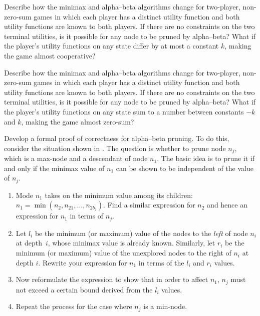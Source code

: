 \begin{uexercise}
Describe how the minimax and alpha--beta algorithms change for two-player,
non-zero-sum games in which each player 
has a distinct utility function and both utility functions are known to both players.  If there are no constraints on
the two terminal utilities, is it possible for any node to be pruned
by alpha--beta? What if the player's utility functions on
any state differ by at most a constant \(k\), making the game almost
cooperative?
\end{uexercise} 

\begin{iexercise}
Describe how the minimax and alpha--beta algorithms change for two-player,
non-zero-sum games in which each player 
has a distinct utility function and both utility functions are known to both players.  If there are no constraints on
the two terminal utilities, is it possible for any node to be pruned
by alpha--beta? What if the player's utility functions on
any state sum to a number between constants \(-k\) and \(k\), making the game almost
zero-sum?
\end{iexercise} 

\begin{exercise}
Develop a formal proof of correctness for alpha--beta
pruning. To do this, consider the situation shown in
. The question is whether to
prune node \(n_j\), which is a max-node and a descendant of node \(n_1\).
The basic idea is to prune it if and only if the minimax value of \(n_1\)
can be shown to be independent of the value of \(n_j\). 
\begin{enumerate} 
\item Mode \(n_1\) takes on the minimum value among its children: \(n_1 = \min(n_2,n_{{21}},\ldots,n_{2b_2})\).
Find a similar expression for \(n_2\) and hence an
expression for \(n_1\) in terms of \(n_j\).
\item Let \(l_i\) be the minimum (or maximum) value of the nodes to
the {\em left} of node \(n_i\) at depth~\(i\), whose minimax
value is already known. Similarly, let \(r_i\) be the minimum (or maximum) value of the unexplored
nodes to the right of \(n_i\) at depth \(i\). Rewrite your expression for \(n_1\) in terms of the \(l_i\) and
\(r_i\) values.
\item Now reformulate the expression to show that in order to affect
\(n_1\), \(n_j\) must not exceed a certain bound derived from the \(l_i\)
values.
\item Repeat the process for the case where \(n_j\) is a min-node.
\end{enumerate}
\end{exercise} 

